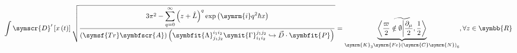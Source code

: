 \documentclass{article}
\begin{document}
$$
\displaystyle\int
\symscr{D}'
\left[ 
  x \left( t \right)
\right]
\sqrt{
  \frac{
    3\pi^2 -
    \displaystyle\sum_{q=0}^{\infty}
    \left( z + \hat{L} \right)^q
    \exp \left( \symrm{i} q^2 \hbar x \right)
  }{
    \left( \symsf{Tr} \symbfscr{A} \right)
    \left( 
      \symbfit{\Lambda} ^{i_1 i_2} _{j_1 j_2}
      \symit{\Gamma} ^{j_1 j_2} _{i_1 i_2}
      \hookrightarrow \vec{D} \cdot \symbfit{P}
    \right)
  }
}
=
\underbrace{
  \widetilde{
    \left\langle
      \frac{\varpi}{2} \notin \emptyset
    \middle\vert
      \frac{\partial_\mu}{2}, \frac12
    \right\rangle
  }
}_{
  \symrm{K}_3 \symrm{Fe} \left( \symrm{C} \symrm{N} \right) _6
}
,
\forall z \in \symbb{R}
$$
\end{document}
